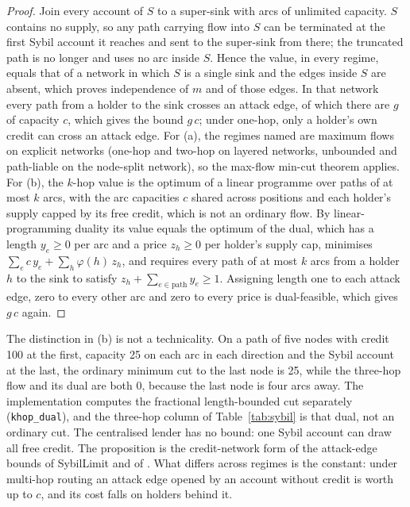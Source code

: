 \documentclass[11pt]{article}
\theoremstyle{plain}
\theoremstyle{definition}
\begin{document}
\begin{proof}
Join every account of $S$ to a super-sink with arcs of unlimited capacity. $S$ contains no supply, so
any path carrying flow into $S$ can be terminated at the first Sybil account it reaches and sent
to the super-sink from there; the truncated path is no longer and uses no arc inside $S$. Hence
the value, in every regime, equals that of a network in which $S$ is a single sink and the edges
inside $S$ are absent, which proves independence of $m$ and of those edges. In that network every
path from a holder to the sink crosses an attack edge, of which there are $g$ of capacity $c$,
which gives the bound $g\,c$; under one-hop, only a holder's own credit can cross an attack edge.
For (a), the regimes named are maximum flows on explicit networks (one-hop and two-hop on layered
networks, unbounded and path-liable on the node-split network), so the max-flow min-cut theorem
\citep{ford1956} applies. For (b), the $k$-hop value is the optimum of a linear programme over paths
of at most $k$ arcs, with the arc capacities $c$ shared across positions and each holder's supply
capped by its free credit, which is not an ordinary flow. By linear-programming duality its value
equals the optimum of the dual, which has a length $y_e\ge0$ per arc and a price $z_h\ge0$ per
holder's supply cap, minimises $\sum_e c\,y_e+\sum_h\varphi(h)\,z_h$, and requires every path of at
most $k$ arcs from a holder $h$ to the sink to satisfy $z_h+\sum_{e\in\text{path}}y_e\ge1$.
Assigning length one to each attack edge, zero to every other arc and zero to every price is
dual-feasible, which gives $g\,c$ again.
\end{proof}

The distinction in (b) is not a technicality. On a path of five nodes with credit 100 at the first,
capacity 25 on each arc in each direction and the Sybil account at the last, the ordinary minimum
cut to the last node is 25, while the three-hop flow and its dual are both 0, because the last node
is four arcs away. The implementation computes the fractional length-bounded cut separately
(\texttt{khop\_dual}), and the three-hop column of Table~\ref{tab:sybil} is that dual, not an
ordinary cut. The centralised lender has no bound: one Sybil account can draw all free credit. The
proposition is the credit-network form of the attack-edge bounds of SybilLimit
\citep{yu2008sybillimit} and of \citet{litos2017trust}. What differs across regimes is the constant:
under multi-hop routing an attack edge opened by an account without credit is worth up to $c$, and
its cost falls on holders behind it.
\end{document}
